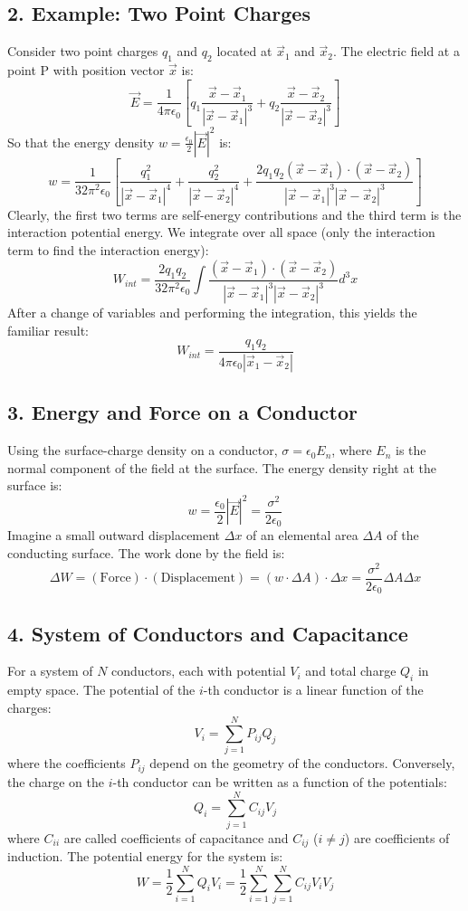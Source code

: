 \documentclass[12pt, a4paper]{article}
\begin{document}
	\subsection*{2. Example: Two Point Charges}
	
	Consider two point charges $q_1$ and $q_2$ located at $\vec{x}_1$ and $\vec{x}_2$. The electric field at a point P with position vector $\vec{x}$ is:
	$$
	\vec{E} = \frac{1}{4\pi\epsilon_0} \left[ q_1 \frac{\vec{x}-\vec{x}_1}{|\vec{x}-\vec{x}_1|^3} + q_2 \frac{\vec{x}-\vec{x}_2}{|\vec{x}-\vec{x}_2|^3} \right]
	$$
	So that the energy density $w = \frac{\epsilon_0}{2}|\vec{E}|^2$ is:
	$$
	w = \frac{1}{32\pi^2\epsilon_0} \left[ \frac{q_1^2}{|\vec{x}-\vec{x}_1|^4} + \frac{q_2^2}{|\vec{x}-\vec{x}_2|^4} + \frac{2q_1q_2(\vec{x}-\vec{x}_1)\cdot(\vec{x}-\vec{x}_2)}{|\vec{x}-\vec{x}_1|^3|\vec{x}-\vec{x}_2|^3} \right]
	$$
	Clearly, the first two terms are self-energy contributions and the third term is the interaction potential energy. We integrate over all space (only the interaction term to find the interaction energy):
	$$
	W_{int} = \frac{2q_1q_2}{32\pi^2\epsilon_0} \int \frac{(\vec{x}-\vec{x}_1)\cdot(\vec{x}-\vec{x}_2)}{|\vec{x}-\vec{x}_1|^3|\vec{x}-\vec{x}_2|^3} d^3x
	$$
	After a change of variables and performing the integration, this yields the familiar result:
	$$
	W_{int} = \frac{q_1q_2}{4\pi\epsilon_0 |\vec{x}_1 - \vec{x}_2|}
	$$
	
	\subsection*{3. Energy and Force on a Conductor}
	Using the surface-charge density on a conductor, $\sigma = \epsilon_0 E_n$, where $E_n$ is the normal component of the field at the surface. The energy density right at the surface is:
	$$
	w = \frac{\epsilon_0}{2} |\vec{E}|^2 = \frac{\sigma^2}{2\epsilon_0}
	$$
	Imagine a small outward displacement $\Delta x$ of an elemental area $\Delta A$ of the conducting surface. The work done by the field is:
	$$
	\Delta W = (\text{Force}) \cdot (\text{Displacement}) = (w \cdot \Delta A) \cdot \Delta x = \frac{\sigma^2}{2\epsilon_0}\Delta A \Delta x
	$$
	
	\subsection*{4. System of Conductors and Capacitance}
	For a system of $N$ conductors, each with potential $V_i$ and total charge $Q_i$ in empty space. The potential of the $i$-th conductor is a linear function of the charges:
	$$
	V_i = \sum_{j=1}^{N} P_{ij} Q_j
	$$
	where the coefficients $P_{ij}$ depend on the geometry of the conductors. Conversely, the charge on the $i$-th conductor can be written as a function of the potentials:
	$$
	Q_i = \sum_{j=1}^{N} C_{ij} V_j
	$$
	where $C_{ii}$ are called coefficients of capacitance and $C_{ij}$ ($i \neq j$) are coefficients of induction. The potential energy for the system is:
	$$
	W = \frac{1}{2} \sum_{i=1}^{N} Q_i V_i = \frac{1}{2} \sum_{i=1}^{N} \sum_{j=1}^{N} C_{ij} V_i V_j
	$$
	
\end{document}
